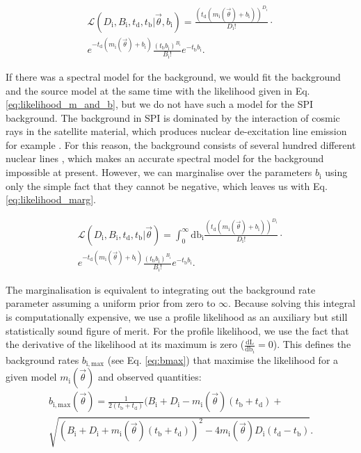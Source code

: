 \documentclass{aa}
\begin{document}
\begin{multline}
        \mathcal{L}(D_{\mathrm{i}}, B_{\mathrm{i}},t_{\mathrm{d}},t_{\mathrm{b}}|\vec{\theta}, b_{\mathrm{i}}) = \frac{(t_{\mathrm{d}}(m_{\mathrm{i}}(\vec{\theta})+ b_{\mathrm{i}}))^{D_{\mathrm{i}}}}{D_{\mathrm{i}}!}\cdot \\
  e^{-t_{\mathrm{d}}(m_{\mathrm{i}}(\vec{\theta})+b_{\mathrm{i}})}\frac{(t_{\mathrm{b}} b_{\mathrm{i}})^{B_{\mathrm{i}}}}{B_{\mathrm{i}}!} e^{-t_{\mathrm{b}} b_{\mathrm{i}}}.
  \label{eq:likelihood_m_and_b}
\end{multline}

\noindent
If there was a spectral model for the background, we would fit the background and the source model at the same time with the likelihood given in Eq. \ref{eq:likelihood_m_and_b}, but we do not have such a model for the SPI background. The background in SPI is dominated by the interaction of cosmic rays in the satellite material, which produces nuclear de-excitation line emission for example \citep{spi_bkg}. For this reason, the background consists of several hundred different nuclear lines \citep{spi_bkg}, which makes an accurate spectral model for the background impossible at present. However, we can marginalise over the parameters $b_{\mathrm{i}}$ using only the simple fact that they cannot be negative, which leaves us with Eq. \ref{eq:likelihood_marg}.

\begin{multline}
        \mathcal{L}(D_{\mathrm{i}}, B_{\mathrm{i}},t_{\mathrm{d}},t_{\mathrm{b}}|\vec{\theta}) = \int_{0}^{\infty}\textrm{db}_{\mathrm{i}}\frac{(t_{\mathrm{d}}(m_{\mathrm{i}}(\vec{\theta})+ b_{\mathrm{i}}))^{D_{\mathrm{i}}}}{D_{\mathrm{i}}!}\cdot\\
  e^{-t_{\mathrm{d}}(m_{\mathrm{i}}(\vec{\theta})+b_{\mathrm{i}})} \frac{(t_{\mathrm{b}} b_{\mathrm{i}})^{B_{\mathrm{i}}}}{B_{\mathrm{i}}!} e^{-t_{\mathrm{b}}b_{\mathrm{i}}}.
  \label{eq:likelihood_marg}
\end{multline}

\noindent
The marginalisation is equivalent to integrating out the background rate parameter assuming a uniform prior from zero to $\infty$. Because solving this integral is computationally expensive, we use a profile likelihood as an auxiliary but still statistically sound figure of merit. For the profile likelihood, we use the fact that the derivative of the likelihood at its maximum is zero ($\frac{\textrm{dL}}{\textrm{db}_i}=0$). This defines the background rates $b_\mathrm{{i, max}}$ (see Eq. \ref{eq:bmax}) that maximise the likelihood for a given model $m_{\mathrm{i}}(\vec{\theta})$ and observed quantities:
\begin{multline}
        b_{\mathrm{i,max}}(\vec{\theta})=\frac{1}{2(t_{\mathrm{b}}+t_{\mathrm{d}})}(B_{\mathrm{i}}+D_{\mathrm{i}}-m_{\mathrm{i}}(\vec{\theta})(t_{\mathrm{b}}+t_{\mathrm{d}})+\\
  \sqrt{(B_{\mathrm{i}}+D_{\mathrm{i}}+m_{\mathrm{i}}(\vec{\theta})(t_{\mathrm{b}}+t_{\mathrm{d}}))^{2}-4m_{\mathrm{i}}(\vec{\theta})D_{\mathrm{i}}(t_{\mathrm{d}}-t_{\mathrm{b}})}.
  \label{eq:bmax}
\end{multline}
\end{document}
